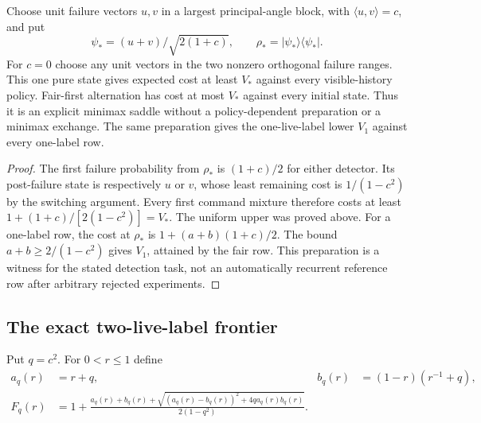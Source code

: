 \begin{corollary}\label{cor:detector-saddle}
Choose unit failure vectors $u,v$ in a largest principal-angle block, with $\langle u,v\rangle=c$, and put
\[
 \psi_*=(u+v)/\sqrt{2(1+c)},\qquad \rho_*=|\psi_*\rangle\langle\psi_*|.
\]
For $c=0$ choose any unit vectors in the two nonzero orthogonal failure ranges. This one pure state gives expected cost at least $V_*$ against every visible-history policy. Fair-first alternation has cost at most $V_*$ against every initial state. Thus it is an explicit minimax saddle without a policy-dependent preparation or a minimax exchange. The same preparation gives the one-live-label lower $V_1$ against every one-label row.
\end{corollary}
\begin{proof}
The first failure probability from $\rho_*$ is $(1+c)/2$ for either detector. Its post-failure state is respectively $u$ or $v$, whose least remaining cost is $1/(1-c^2)$ by the switching argument. Every first command mixture therefore costs at least $1+(1+c)/[2(1-c^2)]=V_*$. The uniform upper was proved above. For a one-label row, the cost at $\rho_*$ is $1+(a+b)(1+c)/2$. The bound $a+b\ge2/(1-c^2)$ gives $V_1$, attained by the fair row. This preparation is a witness for the stated detection task, not an automatically recurrent reference row after arbitrary rejected experiments.
\end{proof}

\subsection{The exact two-live-label frontier}
Put $q=c^2$. For $0<r\le1$ define
\begin{align}
 a_q(r)&=r+q,&b_q(r)&=(1-r)(r^{-1}+q),\label{eq:two-label-ab}\\
 F_q(r)&=1+\frac{a_q(r)+b_q(r)+\sqrt{(a_q(r)-b_q(r))^2+4q a_q(r)b_q(r)}}{2(1-q^2)}.
 \label{eq:two-label-F}
\end{align}

